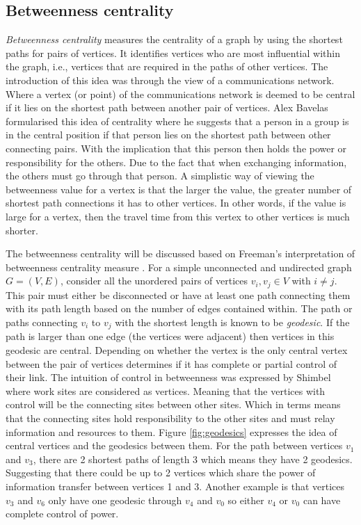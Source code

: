 \subsection{Betweenness centrality}
\emph{Betweenness centrality} measures the centrality of a graph by using the shortest paths for pairs of vertices. It identifies vertices who are most influential within the graph, i.e., vertices that are required in the paths of other vertices. The introduction of this idea was through the view of a communications network. Where a vertex (or point) of the communications network is deemed to be central if it lies on the shortest path between another pair of vertices. Alex Bavelas \cite{bavelas1948mathematical} formularised this idea of centrality where he suggests that a person in a group is in the central position if that person lies on the shortest path between other connecting pairs. With the implication that this person then holds the power or responsibility for the others. Due to the fact that when exchanging information, the others must go through that person. A simplistic way of viewing the betweenness value for a vertex is that the larger the value, the greater number of shortest path connections it has to other vertices. In other words, if the value is large for a vertex, then the travel time from this vertex to other vertices is much shorter. 

The betweenness centrality will be discussed based on Freeman's interpretation of betweenness centrality measure \cite{freeman1977set}. For a simple unconnected and undirected graph $G = (V, E)$, consider all the unordered pairs of vertices $v_i, v_j \in V$ with $i \ne j$. This pair must either be disconnected or have at least one path connecting them with its path length based on the number of edges contained within. The path or paths connecting $v_i$ to $v_j$ with the shortest length is known to be \emph{geodesic}. If the path is larger than one edge (the vertices were adjacent) then vertices in this geodesic are central. Depending on whether the vertex is the only central vertex between the pair of vertices determines if it has complete or partial control of their link. The intuition of control in betweenness was expressed by Shimbel \cite{shimbel1953structural} where work sites are considered as vertices. Meaning that the vertices with control will be the connecting sites between other sites. Which in terms means that the connecting sites hold responsibility to the other sites and must relay information and resources to them. Figure \ref{fig:geodesics} expresses the idea of central vertices and the geodesics between them. For the path between vertices $v_1$ and $v_3$, there are 2 shortest paths of length 3 which means they have 2 geodesics. Suggesting that there could be up to 2 vertices which share the power of information transfer between vertices 1 and 3. Another example is that vertices $v_3$ and $v_6$ only have one geodesic through $v_4$ and $v_0$ so either $v_4$ or $v_0$ can have complete control of power.

